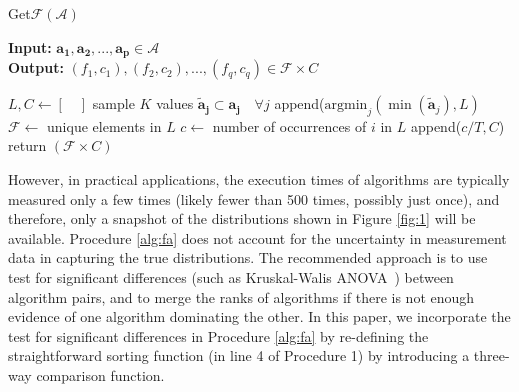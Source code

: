 \documentclass[conference]{IEEEtran}
\newcommand{\p}[1]{{\color{blue} Pdj: #1}}
\begin{document}
\begin{algorithm}
	\caption{ Get$\mathcal{F}$$(\mathcal{A})$ }
	\label{alg:fa}
	\hspace*{\algorithmicindent} \textbf{Input: } $ \mathbf{a_1},\mathbf{a_2} ,..., \mathbf{a_p}\in \mathcal{A}$ \\
	\hspace*{\algorithmicindent} \textbf{Output: } $ (f_1,c_1), (f_2, c_2), ..., (f_q,c_q) \in \mathcal{F} \times C  $
	\begin{algorithmic}[1] 
		\State $L, C \leftarrow [ \quad ]$ 
		\State sample $K$ values $\mathbf{\tilde{a}_{j}} \subset \mathbf{a_j} \quad \forall j$  
		\State append($\text{argmin}_j(\min(\mathbf{\tilde{a}}_j ), L)$ 
		\EndFor
		\State $\mathcal{F} \leftarrow $ unique elements in $L$ 
		\State $c \leftarrow$ number of occurrences of $i$ in $L$ 
		\State append($c/T, C$)
		\EndFor
		\State return $(\mathcal{F} \times C)$
        \end{algorithmic}
\end{algorithm}

However, in practical applications, the execution times of algorithms are typically
measured only a few times (likely fewer than 500 times, possibly just once), and therefore, only a snapshot of the distributions
shown in Figure \ref{fig:1} will be available. Procedure \ref{alg:fa} does not account for the uncertainty in measurement data in capturing the true distributions. 
The recommended approach is to use test for significant differences (such as Kruskal-Walis
ANOVA~\cite{hoefler2015scientific}) between algorithm pairs, and to merge the ranks of algorithms if there is not enough
evidence of one algorithm dominating the other. In this paper, we incorporate the test for significant differences in
Procedure \ref{alg:fa} by re-defining the straightforward sorting function (in line 4 of Procedure 1) by introducing a
three-way comparison function. 
\bigskip
\end{document}
